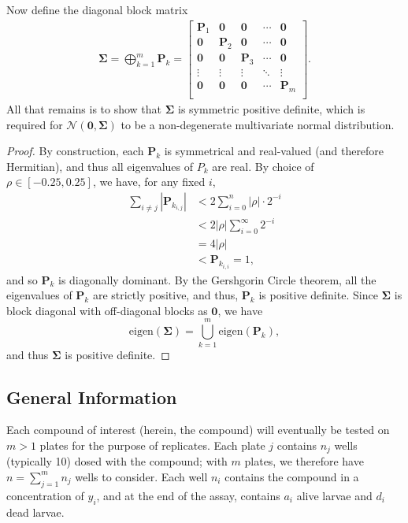 \documentclass[11pt, letterpaper]{article}
\newcommand{\mc}[1]{\mathcal{#1}}
\numberwithin{equation}{section}
\begin{document}
Now define the diagonal block matrix
\begin{align*}
\bm \Sigma = \bigoplus^m_{k=1} \bm P_k = 
\begin{bmatrix}
\bm P_1 & \bm 0 & \bm 0 & \cdots & \bm 0 \\
\bm 0 & \bm P_2 & \bm 0 & \cdots & \bm 0 \\
\bm 0 & \bm 0 & \bm P_3 & \cdots & \bm 0 \\
\vdots & \vdots & \vdots &\ddots & \vdots\\
\bm 0 & \bm 0 & \bm 0 & \cdots & \bm P_m \\
\end{bmatrix}.
\end{align*}
All that remains is to show that $\bm \Sigma$ is symmetric positive definite, which is required for $\mc N(\bm 0, \bm \Sigma)$ to be a non-degenerate multivariate normal distribution. 
\begin{proof}
By construction, each $\bm P_k$ is symmetrical and real-valued (and therefore Hermitian), and thus all eigenvalues of \bm $P_k$ are real. By choice of $\rho \in [-0.25,0.25]$, we have, for any fixed $i$,
\begin{align*}
\sum_{i\neq j} | \bm P_{k_{i,j}}| &< 2 \sum_{i=0}^n |\rho| \cdot 2^{-i} \\
&< 2|\rho| \sum_{i=0}^\infty 2^{-i} \\
&= 4|\rho|\\
&< \bm P_{k_{i,i}} = 1,
\end{align*}
and so $\bm P_k$ is diagonally dominant. By the Gershgorin Circle theorem, all the eigenvalues of $\bm P_k$ are strictly positive, and thus, $\bm P_k$ is positive definite. Since $\bm \Sigma$ is block diagonal with off-diagonal blocks as $\bm 0$, we have 
$$ \text{eigen} \left(\bm \Sigma\right) = \bigcup_{k=1}^m \text{eigen}\left(\bm P_k\right),$$
and thus  $\bm \Sigma$ is positive definite.\qedhere
\end{proof}

\subsection{General Information}


Each compound of interest (herein, the compound) will eventually be tested on $m>1$ plates for the purpose of replicates. Each plate $j$ contains $n_j$ wells (typically 10) dosed with the compound; with $m$ plates, we therefore have $n = \sum_{j=1}^m n_j$ wells to consider. Each well $n_i$ contains the compound in a concentration of $y_i$, and at the end of the assay, contains $a_i$ alive larvae and $d_i$ dead larvae. 
\end{document}
